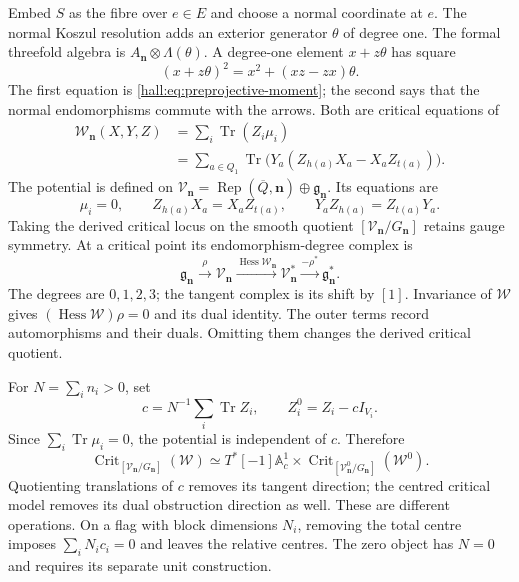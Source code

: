 Embed $S$ as the fibre over $e\in E$ and choose a normal coordinate
at $e$. The normal Koszul resolution adds an exterior generator
$\theta$ of degree one. The formal threefold algebra is
$A_{\mathbf n}\otimes\Lambda(\theta)$.
A degree-one element $x+z\theta$ has square
\[
 (x+z\theta)^2=x^2+(xz-zx)\theta.
\]
The first equation is \eqref{hall:eq:preprojective-moment}; the
second says that the normal endomorphisms commute with the arrows.
Both are critical equations of
\begin{align}
 \mathcal W_{\mathbf n}(X,Y,Z)
 &=\sum_i\operatorname{Tr}(Z_i\mu_i)\label{hall:eq:tripled-potential}\\
 &=\sum_{a\in Q_1}\operatorname{Tr}
       \bigl(Y_a(Z_{h(a)}X_a-X_aZ_{t(a)})\bigr).
 \nonumber
\end{align}
The potential is defined on
$\mathcal V_{\mathbf n}=\operatorname{Rep}(\overline Q,\mathbf n)
\oplus\mathfrak g_{\mathbf n}$. Its equations are
\[
 \mu_i=0,\qquad Z_{h(a)}X_a=X_aZ_{t(a)},\qquad
 Y_aZ_{h(a)}=Z_{t(a)}Y_a.
\]
Taking the derived critical locus on the smooth quotient
$[\mathcal V_{\mathbf n}/G_{\mathbf n}]$ retains gauge symmetry.
At a critical point its endomorphism-degree complex is
\begin{equation}
\label{hall:eq:four-term-gauge-complex}
 \mathfrak g_{\mathbf n}\xrightarrow{\rho}\mathcal V_{\mathbf n}
 \xrightarrow{\operatorname{Hess}\mathcal W_{\mathbf n}}
 \mathcal V_{\mathbf n}^*\xrightarrow{-\rho^*}
 \mathfrak g_{\mathbf n}^*.
\end{equation}
The degrees are $0,1,2,3$; the tangent complex is its shift by $[1]$.
Invariance of $\mathcal W$ gives
$(\operatorname{Hess}\mathcal W)\rho=0$ and its dual identity.
The outer terms record automorphisms and their duals. Omitting them
changes the derived critical quotient.

For $N=\sum_i n_i>0$, set
\[
 c=N^{-1}\sum_i\operatorname{Tr}Z_i,\qquad Z_i^0=Z_i-cI_{V_i}.
\]
Since $\sum_i\operatorname{Tr}\mu_i=0$, the potential is
independent of $c$. Therefore
\[
 \operatorname{Crit}_{[\mathcal V_{\mathbf n}/G_{\mathbf n}]}(\mathcal W)
 \simeq T^*[-1]\mathbb A^1_c\times
 \operatorname{Crit}_{[\mathcal V^0_{\mathbf n}/G_{\mathbf n}]}(\mathcal W^0).
\]
Quotienting translations of $c$ removes its tangent direction; the
centred critical model removes its dual obstruction direction as
well. These are different operations. On a flag with block dimensions
$N_i$, removing the total centre imposes $\sum_i N_ic_i=0$ and
leaves the relative centres.
The zero object has $N=0$ and requires its separate unit construction.

